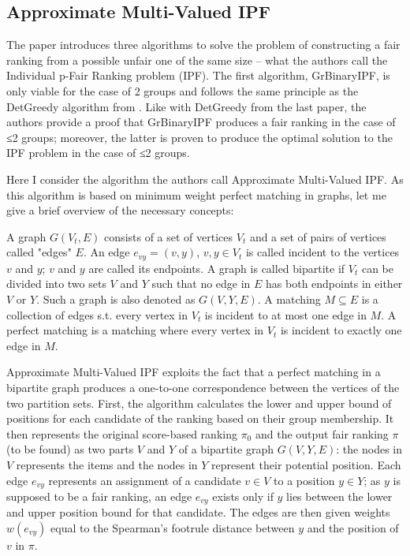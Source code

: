 \subsection{Approximate Multi-Valued IPF}\label{subsect:amvipf}

The paper \cite{RAPF} introduces three algorithms to solve the problem of constructing a fair ranking from a possible unfair one of the same size – what the authors call the Individual p-Fair Ranking problem (IPF). The first algorithm, GrBinaryIPF, is only viable for the case of 2 groups and follows the same principle as the DetGreedy algorithm from \cite{linkedin}. Like with DetGreedy from the last paper, the authors provide a proof that GrBinaryIPF produces a fair ranking in the case of ≤2 groups; moreover, the latter is proven to produce the optimal solution to the IPF problem in the case of ≤2 groups.

Here I consider the algorithm the authors call Approximate Multi-Valued IPF. As this algorithm is based on minimum weight perfect matching in graphs, let me give a brief overview of the necessary concepts:

A graph $G(V_t,E)$ consists of a set of vertices $V_t$ and a set of pairs of vertices called "edges" $E$. An edge $e_{vy} = (v,y)$, $v,y \in V_t$ is called incident to the vertices $v$ and $y$; $v$ and $y$ are called its endpoints. A graph is called bipartite if $V_t$ can be divided into two sets $V$ and $Y$ such that no edge in $E$ has both endpoints in either $V$ or $Y$. Such a graph is also denoted as $G(V,Y,E)$. A matching $M \subseteq E$ is a collection of edges s.t. every vertex in $V_t$ is incident to at most one edge in $M$. A perfect matching is a matching where every vertex in $V_t$ is incident to exactly one edge in $M$.

Approximate Multi-Valued IPF exploits the fact that a perfect matching in a bipartite graph produces a one-to-one correspondence between the vertices of the two partition sets. First, the algorithm calculates the lower and upper bound of positions for each candidate of the ranking based on their group membership. It then represents the original score-based ranking $\pi_0$ and the output fair ranking $\pi$ (to be found) as two parts $V$ and $Y$ of a bipartite graph $G(V,Y,E)$: the nodes in $V$ represents the items and the nodes in $Y$ represent their potential position. Each edge $e_{vy}$ represents an assignment of a candidate $v \in V$ to a position $y \in Y$; as $y$ is supposed to be a fair ranking, an edge $e_{vy}$ exists only if $y$ lies between the lower and upper position bound for that candidate. The edges are then given weights $w(e_{vy})$ equal to the Spearman's footrule distance between $y$ and the position of $v$ in $\pi$.

